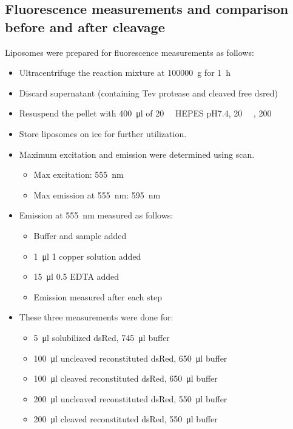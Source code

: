 \subsection{Fluorescence measurements and comparison before and after cleavage}

Liposomes were prepared for fluorescence measurements as follows:

\begin{itemize}
	\item Ultracentrifuge the reaction mixture at \SI{100000}{g} for \SI{1}{\hour}
    	\item Discard supernatant (containing Tev protease and cleaved free dsred)
	\item Resuspend the pellet with \SI{400}{\ul} of \SI{20}{\milli\Molar}
		HEPES pH7.4, \SI{20}{\milli\Molar} ,
		\SI{200}{\milli\Molar} 
    	\item Store liposomes on ice for further utilization.
	\item Maximum excitation and emission were determined using scan.
		\begin{itemize}
			\item Max excitation: \SI{555}{\nm}
			\item Max emission at \SI{555}{\nm}: \SI{595}{\nm}
		\end{itemize}
	\item Emission at \SI{555}{\nm} measured as follows:
		\begin{itemize}
			\item Buffer and sample added
			\item \SI{1}{\ul} \SI{1}{\Molar} copper solution added
			\item \SI{15}{\ul} \SI{0.5}{\Molar} EDTA added
			\item Emission measured after each step
		\end{itemize}
	\item These three measurements were done for:
		\begin{itemize}
			\item \SI{5}{\ul} solubilized dsRed, \SI{745}{\ul} buffer
			\item \SI{100}{\ul} uncleaved reconstituted dsRed, \SI{650}{\ul} buffer
			\item \SI{100}{\ul} cleaved reconstituted dsRed, \SI{650}{\ul} buffer
			\item \SI{200}{\ul} uncleaved reconstituted dsRed, \SI{550}{\ul} buffer
			\item \SI{200}{\ul} cleaved reconstituted dsRed, \SI{550}{\ul} buffer
		\end{itemize}
\end{itemize}

